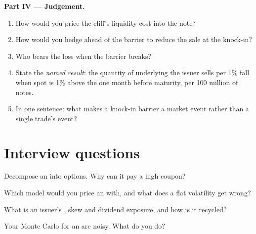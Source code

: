 \begin{problem}
\medskip\noindent\textbf{Part IV --- Judgement.}
\begin{enumerate}[resume]
\item How would you price the cliff's liquidity cost into the note?
\item How would you hedge ahead of the barrier to reduce the sale at the knock-in?
\item Who bears the loss when the barrier breaks?
\item State the \emph{named result}: the quantity of underlying the issuer sells per 1\% fall when spot is 1\% above the  one month before maturity, per 100 million of notes.
\item In one sentence: what makes a knock-in barrier a market event rather than a single trade's event?
\end{enumerate}
\end{problem}

\section{Interview questions}

\begin{interviewq}\label{iq:dv:autocallables:1}
Decompose an  into options. Why can it pay a high coupon?
\end{interviewq}

\begin{interviewq}\label{iq:dv:autocallables:2}
Which model would you price an  with, and what does a flat volatility get wrong?
\end{interviewq}

\begin{interviewq}\label{iq:dv:autocallables:3}
What is an  issuer's , skew and dividend exposure, and how is it recycled?
\end{interviewq}

\begin{interviewq}\label{iq:dv:autocallables:4}
Your Monte Carlo  for an  are noisy. What do you do?
\end{interviewq}


